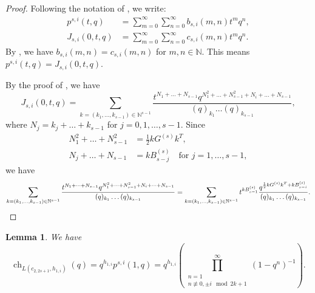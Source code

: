 \documentclass[a4paper, 12pt, reqno]{amsart}
\newtheorem{lemma}[theorem]{Lemma}
\theoremstyle{remark}
\DeclareMathOperator{\ch}{ch}
\begin{document}
\begin{proof}
  Following the notation of \cite[\S7.2]{andrews_theory_1998}, we write:
  \begin{align*}
    p^{s, i}(t, q) &= \sum_{m = 0}^{\infty}\sum_{n = 0}^{\infty}b_{s, i}(m, n)t^mq^n, \\
    J_{s, i}(0, t, q) &= \sum_{m = 0}^{\infty}\sum_{n = 0}^{\infty}c_{s, i}(m, n)t^mq^n.
  \end{align*}
  By \cite[\S7.3]{andrews_theory_1998}, we have $b_{s, i}(m, n) = c_{s, i}(m, n)$ for $m, n \in \mathbb{N}$.
  This means $p^{s, i}(t, q) = J_{s, i}(0, t, q)$.

  By the proof of \cite[Theorem 7.8]{andrews_theory_1998}, we have
  \begin{equation*}
    J_{s, i}(0, t, q) = \sum_{k = (k_1, \dots, k_{s - 1}) \in \mathbb{N}^{s - 1}}\frac{t^{N_1 + \dots + N_{s - 1}}q^{N_1^2 + \dots + N_{s - 1}^2 + N_i + \dots + N_{s - 1}}}{(q)_{k_1}\dots(q)_{k_{s - 1}}},
  \end{equation*}
  where $N_j = k_j + \dots + k_{s - 1}$ for $j = 0, 1, \dots, s - 1$.
  Since
  \begin{align*}
    N_1^2 + \dots + N_{s - 1}^2 &= \frac{1}{2}kG^{(s)}k^T, \\
    N_j + \dots + N_{s - 1} &= kB^{(s)}_{s - j} \quad \text{for $j = 1, \dots, s - 1$},
  \end{align*}
  we have
  \begin{equation*}
    \sum_{k = (k_1, \dots, k_{s - 1}) \in \mathbb{N}^{s - 1}}\frac{t^{N_1 + \dots + N_{s - 1}}q^{N_1^2 + \dots + N_{s - 1}^2 + N_i + \dots + N_{s - 1}}}{(q)_{k_1}\dots(q)_{k_{s - 1}}} = \sum_{k = (k_1, \dots, k_{s - 1}) \in \mathbb{N}^{s - 1}}t^{kB^{(s)}_{s - 1}}\frac{q^{\frac{1}{2}kG^{(s)}k^T + kB^{(s)}_{s - i}}}{(q)_{k_1}\dots(q)_{k_{s - 1}}}. \qedhere
  \end{equation*}
\end{proof}

\begin{lemma}
  \label{lmm:10}
  We have
  \begin{equation*}
    \ch_{L(c_{2, 2s + 1}, h_{1, i})}(q) = q^{h_{1, i}}p^{s, i}(1, q) = q^{h_{1, i}}\left(\prod^{\infty}_{\substack{n = 1 \\ n \not\equiv 0, \pm i \mod 2k + 1}}(1 - q^n)^{-1}\right).
  \end{equation*}
\end{lemma}
\end{document}
